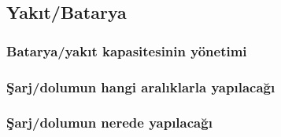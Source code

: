 \subsection{Yakıt/Batarya}

\subsubsection{Batarya/yakıt kapasitesinin yönetimi}
\subsubsection{Şarj/dolumun hangi aralıklarla yapılacağı}
\subsubsection{Şarj/dolumun nerede yapılacağı}


\newpage
\printbibliography
    


